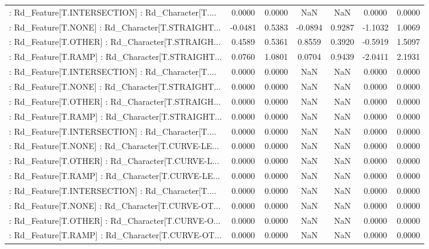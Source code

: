 \begin{longtable}{p{4cm}cccccc}
 : Rd\_Feature[T.INTERSECTION] : Rd\_Character[T.... &  0.0000 &    0.0000 &     NaN &          NaN &  0.0000 &  0.0000 \\
 : Rd\_Feature[T.NONE] : Rd\_Character[T.STRAIGHT... & -0.0481 &    0.5383 & -0.0894 &       0.9287 & -1.1032 &  1.0069 \\
 : Rd\_Feature[T.OTHER] : Rd\_Character[T.STRAIGH... &  0.4589 &    0.5361 &  0.8559 &       0.3920 & -0.5919 &  1.5097 \\
 : Rd\_Feature[T.RAMP] : Rd\_Character[T.STRAIGHT... &  0.0760 &    1.0801 &  0.0704 &       0.9439 & -2.0411 &  2.1931 \\
 : Rd\_Feature[T.INTERSECTION] : Rd\_Character[T.... &  0.0000 &    0.0000 &     NaN &          NaN &  0.0000 &  0.0000 \\
 : Rd\_Feature[T.NONE] : Rd\_Character[T.STRAIGHT... &  0.0000 &    0.0000 &     NaN &          NaN &  0.0000 &  0.0000 \\
 : Rd\_Feature[T.OTHER] : Rd\_Character[T.STRAIGH... &  0.0000 &    0.0000 &     NaN &          NaN &  0.0000 &  0.0000 \\
 : Rd\_Feature[T.RAMP] : Rd\_Character[T.STRAIGHT... &  0.0000 &    0.0000 &     NaN &          NaN &  0.0000 &  0.0000 \\
 : Rd\_Feature[T.INTERSECTION] : Rd\_Character[T.... &  0.0000 &    0.0000 &     NaN &          NaN &  0.0000 &  0.0000 \\
 : Rd\_Feature[T.NONE] : Rd\_Character[T.CURVE-LE... &  0.0000 &    0.0000 &     NaN &          NaN &  0.0000 &  0.0000 \\
 : Rd\_Feature[T.OTHER] : Rd\_Character[T.CURVE-L... &  0.0000 &    0.0000 &     NaN &          NaN &  0.0000 &  0.0000 \\
 : Rd\_Feature[T.RAMP] : Rd\_Character[T.CURVE-LE... &  0.0000 &    0.0000 &     NaN &          NaN &  0.0000 &  0.0000 \\
 : Rd\_Feature[T.INTERSECTION] : Rd\_Character[T.... &  0.0000 &    0.0000 &     NaN &          NaN &  0.0000 &  0.0000 \\
 : Rd\_Feature[T.NONE] : Rd\_Character[T.CURVE-OT... &  0.0000 &    0.0000 &     NaN &          NaN &  0.0000 &  0.0000 \\
 : Rd\_Feature[T.OTHER] : Rd\_Character[T.CURVE-O... &  0.0000 &    0.0000 &     NaN &          NaN &  0.0000 &  0.0000 \\
 : Rd\_Feature[T.RAMP] : Rd\_Character[T.CURVE-OT... &  0.0000 &    0.0000 &     NaN &          NaN &  0.0000 &  0.0000 \\

\end{longtable}
